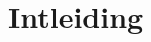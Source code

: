 \documentclass{article}
\numberwithin{equation}{section}
\begin{document}

\tableofcontents

\section{Intleiding}
\end{document}
